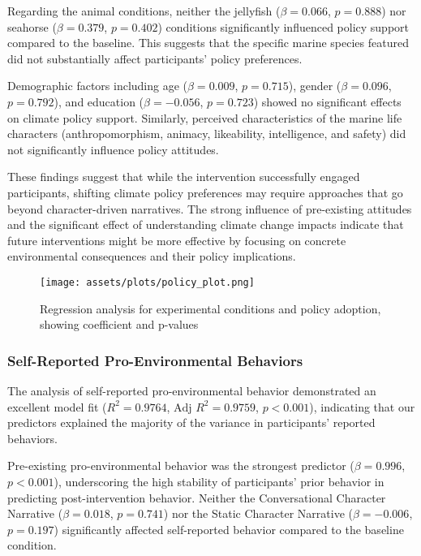 \documentclass[sigconf, nonacm]{acmart}
\begin{document}
Regarding the animal conditions, neither the jellyfish ($\beta = 0.066$, $p = 0.888$) nor seahorse ($\beta = 0.379$, $p = 0.402$) conditions significantly influenced policy support compared to the baseline. This suggests that the specific marine species featured did not substantially affect participants' policy preferences.

Demographic factors including age ($\beta = 0.009$, $p = 0.715$), gender ($\beta = 0.096$, $p = 0.792$), and education ($\beta = -0.056$, $p = 0.723$) showed no significant effects on climate policy support. Similarly, perceived characteristics of the marine life characters (anthropomorphism, animacy, likeability, intelligence, and safety) did not significantly influence policy attitudes.

These findings suggest that while the intervention successfully engaged participants, shifting climate policy preferences may require approaches that go beyond character-driven narratives. The strong influence of pre-existing attitudes and the significant effect of understanding climate change impacts indicate that future interventions might be more effective by focusing on concrete environmental consequences and their policy implications.

\begin{figure}
    \centering
    \texttt{[image: assets/plots/policy\_plot.png]}
    \caption{Regression analysis for experimental conditions and policy adoption, showing coefficient and p-values}
    \label{fig:policy_post}
\end{figure}

\subsubsection{Self-Reported Pro-Environmental Behaviors}

The analysis of self-reported pro-environmental behavior demonstrated an excellent model fit (\(R^2 = 0.9764\), \(\text{Adj } R^2 = 0.9759\), \(p < 0.001\)), indicating that our predictors explained the majority of the variance in participants' reported behaviors.

Pre-existing pro-environmental behavior was the strongest predictor (\(\beta = 0.996\), \(p < 0.001\)), underscoring the high stability of participants' prior behavior in predicting post-intervention behavior. Neither the Conversational Character Narrative (\(\beta = 0.018\), \(p = 0.741\)) nor the Static Character Narrative (\(\beta = -0.006\), \(p = 0.197\)) significantly affected self-reported behavior compared to the baseline condition.
\end{document}
